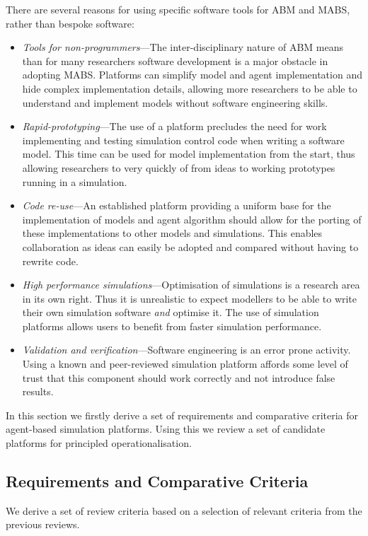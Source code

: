 There are several reasons for using specific software tools for \ac{ABM} and \ac{MABS}, rather than bespoke software:
\begin{itemize}
\item \emph{Tools for non-programmers}---The inter-disciplinary nature of \ac{ABM} means than for many researchers software development is a major obstacle in adopting \ac{MABS}. Platforms can simplify model and agent implementation and hide complex implementation details, allowing more researchers to be able to understand and implement models without software engineering skills.
\item \emph{Rapid-prototyping}---The use of a platform precludes the need for work implementing and testing simulation control code when writing a software model. This time can be used for model implementation from the start, thus allowing researchers to very quickly of from ideas to working prototypes running in a simulation.
\item \emph{Code re-use}---An established platform providing a uniform base for the implementation of models and agent algorithm should allow for the porting of these implementations to other models and simulations. This enables collaboration as ideas can easily be adopted and compared without having to rewrite code.
\item \emph{High performance simulations}---Optimisation of simulations is a research area in its own right. Thus it is unrealistic to expect modellers to be able to write their own simulation software \emph{and} optimise it. The use of simulation platforms allows users to benefit from faster simulation performance.
\item \emph{Validation and verification}---Software engineering is an error prone activity. Using a known and peer-reviewed simulation platform affords some level of trust that this component should work correctly and not introduce false results. 
\end{itemize}

In this section we firstly derive a set of requirements and comparative criteria for agent-based simulation platforms. Using this we review a set of candidate platforms for principled operationalisation. 

\subsection{Requirements and Comparative Criteria}

We derive a set of review criteria based on a selection of relevant criteria from the previous reviews.

